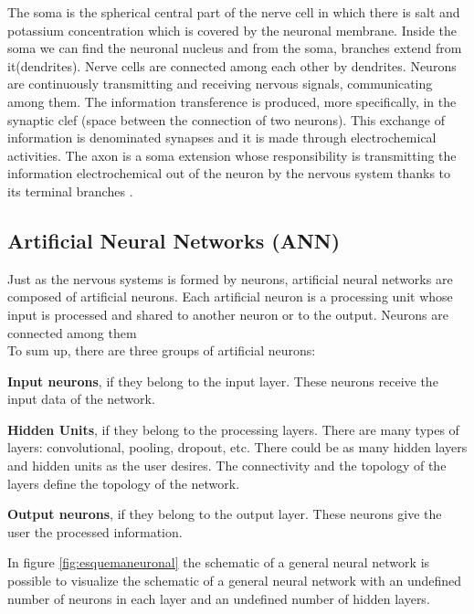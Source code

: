 The soma is the spherical central part of the nerve cell in which there is  salt and potassium concentration which is covered by the neuronal membrane. Inside the soma we can find the neuronal nucleus and from the soma, branches  extend  from it(dendrites). Nerve cells are connected among each other by dendrites. Neurons are continuously transmitting and receiving nervous signals, communicating among them. The information transference is produced, more specifically, in the synaptic clef (space between the connection of two neurons). This exchange of information is denominated synapses and it is made through electrochemical activities. The axon is a soma extension whose responsibility is transmitting the information electrochemical out of the neuron by the nervous system thanks to its terminal branches \cite{BINN, neuroscience}.

\subsection{Artificial Neural Networks (ANN)}
Just as the nervous systems is formed by neurons, artificial neural networks are composed of artificial neurons. Each artificial neuron is a processing unit whose input is processed and shared to another neuron or to the output. Neurons are connected among them \cite{BINN}\\

To sum up, there are three groups of artificial neurons:
\begin{description}[itemsep=2pt,topsep=8pt,parsep=0pt,partopsep=20pt]
\item \textbf{Input neurons}, if they belong to the input layer. These neurons receive the input data of the network.
\item \textbf{Hidden Units}, if they belong to the processing layers. There are many types of layers: convolutional, pooling, dropout, etc. There could be as many hidden layers and hidden units as the user desires. The connectivity and the topology of the layers define the topology of the network.
\item \textbf{Output neurons}, if they belong to the output layer. These neurons give the user the processed information.
\end{description}

In figure \ref{fig:esquemaneuronal} the schematic of a general neural network  is possible to visualize the schematic of a general neural network with an undefined number of neurons in each layer and an undefined number of hidden layers.\\

